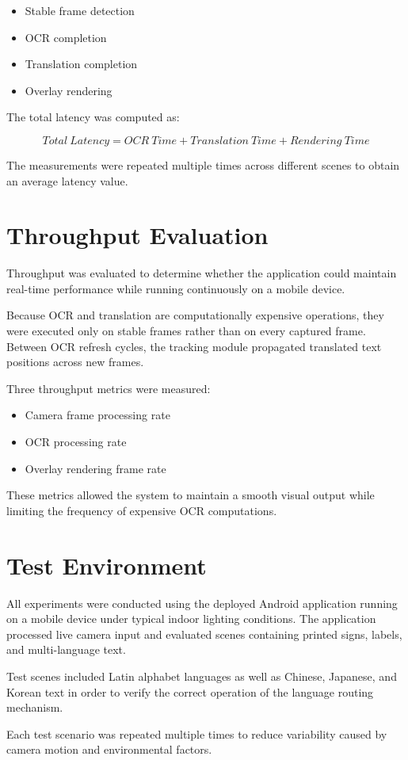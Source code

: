 \begin{itemize}
\item Stable frame detection
\item OCR completion
\item Translation completion
\item Overlay rendering
\end{itemize}

The total latency was computed as:

\begin{equation}
Total\ Latency = OCR\ Time + Translation\ Time + Rendering\ Time
\end{equation}

The measurements were repeated multiple times across different scenes to obtain an average latency value.

\section{Throughput Evaluation}

Throughput was evaluated to determine whether the application could maintain real-time performance while running continuously on a mobile device.

Because OCR and translation are computationally expensive operations, they were executed only on stable frames rather than on every captured frame. Between OCR refresh cycles, the tracking module propagated translated text positions across new frames.

Three throughput metrics were measured:

\begin{itemize}
\item Camera frame processing rate
\item OCR processing rate
\item Overlay rendering frame rate
\end{itemize}

These metrics allowed the system to maintain a smooth visual output while limiting the frequency of expensive OCR computations.

\section{Test Environment}

All experiments were conducted using the deployed Android application running on a mobile device under typical indoor lighting conditions. The application processed live camera input and evaluated scenes containing printed signs, labels, and multi-language text.

Test scenes included Latin alphabet languages as well as Chinese, Japanese, and Korean text in order to verify the correct operation of the language routing mechanism.

Each test scenario was repeated multiple times to reduce variability caused by camera motion and environmental factors.